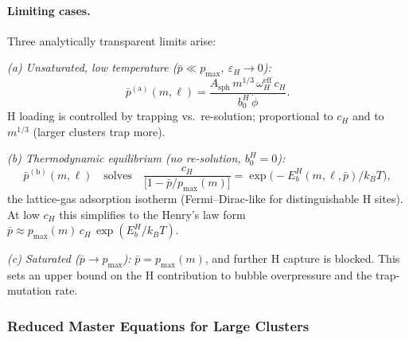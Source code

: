\paragraph{Limiting cases.}
Three analytically transparent limits arise:

\textit{(a) Unsaturated, low temperature ($\bar{p} \ll p_{\max}$,
$\varepsilon_H \to 0$):}
\begin{equation}\label{eq:pbar_lowT}
    \bar{p}^{\mathrm{(a)}}(m,\ell)
    = \frac{A_{\mathrm{sph}}\,m^{1/3}\,\omega_H^{\mathrm{eff}}\,c_H}
           {b_0^H\,\dot{\phi}}.
\end{equation}
H loading is controlled by trapping vs.\ re-solution; proportional to
$c_H$ and to $m^{1/3}$ (larger clusters trap more).

\textit{(b) Thermodynamic equilibrium (no re-solution,
$b_0^H = 0$):}
\begin{equation}\label{eq:pbar_thermo}
    \bar{p}^{\mathrm{(b)}}(m,\ell)
    \quad\text{solves}\quad
    \frac{c_H}{\bigl[1 - \bar{p}/p_{\max}(m)\bigr]}
    = \exp\!\bigl(-E_b^H(m,\ell,\bar{p})/k_BT\bigr),
\end{equation}
the lattice-gas adsorption isotherm (Fermi--Dirac-like for
distinguishable H sites).  At low $c_H$ this simplifies to the Henry's
law form $\bar{p} \approx p_{\max}(m)\,c_H\,\exp(E_b^H/k_BT)$.

\textit{(c) Saturated ($\bar{p} \to p_{\max}$):}
$\bar{p} = p_{\max}(m)$, and further H capture is blocked.
This sets an upper bound on the H contribution to bubble
overpressure and the trap-mutation rate.

\subsubsection{Reduced Master Equations for Large Clusters}
\label{sec:ME_large_H}

